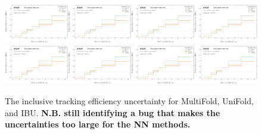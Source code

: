 \begin{figure}[h!]
\includegraphics[width=0.25\textwidth,page=65]{figures/SimResults/TrackJet_SystEffect.pdf}\includegraphics[width=0.25\textwidth,page=69]{figures/SimResults/TrackJet_SystEffect.pdf}\includegraphics[width=0.25\textwidth,page=73]{figures/SimResults/TrackJet_SystEffect.pdf}\includegraphics[width=0.25\textwidth,page=77]{figures/SimResults/TrackJet_SystEffect.pdf}\\
\includegraphics[width=0.25\textwidth,page=81]{figures/SimResults/TrackJet_SystEffect.pdf}\includegraphics[width=0.25\textwidth,page=85]{figures/SimResults/TrackJet_SystEffect.pdf}\includegraphics[width=0.25\textwidth,page=89]{figures/SimResults/TrackJet_SystEffect.pdf}\includegraphics[width=0.25\textwidth,page=93]{figures/SimResults/TrackJet_SystEffect.pdf}
\caption{The inclusive tracking efficiency uncertainty for MultiFold, UniFold, and IBU.  \textbf{N.B. still identifying a bug that makes the uncertainties too large for the NN methods.}}
\label{fig:simresultsmulti_trackjetuncertsl1}
\end{figure}

